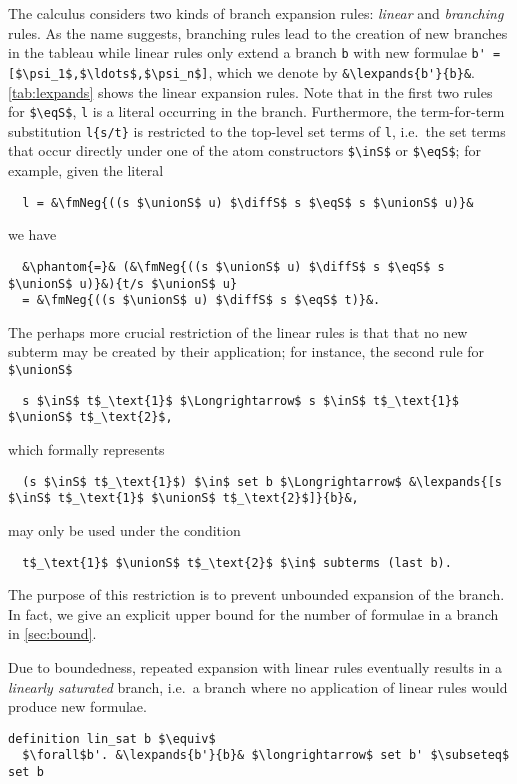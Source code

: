 \documentclass[sigplan,10pt,anonymous,review]{acmart}
\newcommand{\lefttriangle}{\mathrel{\tikz[baseline]{\draw (1ex, 0.75ex) -- (0, 1.25ex) -- (0, 0.25ex) -- cycle;}}}
\newcommand{\lexpands}[2]{#1 $\lefttriangle$ #2}
\newcommand{\unionS}{\sqcup_\text{s}}
\newcommand{\diffS}{-_\text{s}}
\newcommand{\inS}{\in_\text{s}}
\newcommand{\eqS}{=_\text{s}}
\newcommand{\fmNegSymbol}{\boldsymbol{\neg}}
\newcommand{\fmNeg}[1]{$\fmNegSymbol$ #1}
\begin{document}
The calculus considers two kinds of branch expansion rules: \textit{linear} and \textit{branching} rules.
As the name suggests, branching rules lead to the creation of new branches in the tableau while linear rules only extend a branch \lstinline!b! with new formulae \lstinline[breaklines=true]!b' = [$\psi_1$,$\ldots$,$\psi_n$]!, which we denote by \lstinline!&\lexpands{b'}{b}&!.
\autoref{tab:lexpands} shows the linear expansion rules.
Note that in the first two rules for \lstinline!$\eqS$!, \lstinline!l! is a literal occurring in the branch.
Furthermore, the term-for-term substitution \lstinline!l{s/t}! is restricted to the top-level set terms of \lstinline!l!, i.e.\ the set terms that occur directly under one of the atom constructors \lstinline!$\inS$! or \lstinline!$\eqS$!;
for example, given the literal
\begin{lstlisting}
  l = &\fmNeg{((s $\unionS$ u) $\diffS$ s $\eqS$ s $\unionS$ u)}&
\end{lstlisting}
we have
\begin{lstlisting}
  &\phantom{=}& (&\fmNeg{((s $\unionS$ u) $\diffS$ s $\eqS$ s $\unionS$ u)}&){t/s $\unionS$ u}
  = &\fmNeg{((s $\unionS$ u) $\diffS$ s $\eqS$ t)}&.
\end{lstlisting}
The perhaps more crucial restriction of the linear rules is that that no new subterm may be created by their application;
for instance, the second rule for \lstinline!$\unionS$!
\begin{lstlisting}
  s $\inS$ t$_\text{1}$ $\Longrightarrow$ s $\inS$ t$_\text{1}$ $\unionS$ t$_\text{2}$,
\end{lstlisting}
which formally represents 
\begin{lstlisting}
  (s $\inS$ t$_\text{1}$) $\in$ set b $\Longrightarrow$ &\lexpands{[s $\inS$ t$_\text{1}$ $\unionS$ t$_\text{2}$]}{b}&,
\end{lstlisting}
may only be used under the condition
\begin{lstlisting}
  t$_\text{1}$ $\unionS$ t$_\text{2}$ $\in$ subterms (last b).
\end{lstlisting}
The purpose of this restriction is to prevent unbounded expansion of the branch.
In fact, we give an explicit upper bound for the number of formulae in a branch in \autoref{sec:bound}.

Due to boundedness, repeated expansion with linear rules eventually results in a \textit{linearly saturated} branch, i.e.\ a branch where no application of linear rules would produce new formulae.
\begin{lstlisting}
definition lin_sat b $\equiv$
  $\forall$b'. &\lexpands{b'}{b}& $\longrightarrow$ set b' $\subseteq$ set b
\end{lstlisting}
\end{document}
